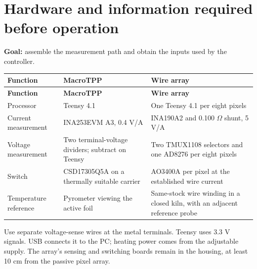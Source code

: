 \documentclass[11pt,letterpaper]{article}
\newlength{\TableWidth}
\begin{document}
\section{Hardware and information required before operation}

\textbf{Goal:} assemble the measurement path and obtain the inputs used by the controller.

\begingroup
\small
\setlength{\tabcolsep}{5pt}
\renewcommand{\arraystretch}{1.14}
\setlength{\TableWidth}{\dimexpr\linewidth-4\tabcolsep\relax}
\begin{longtable}{@{}L{0.220\TableWidth}L{0.400\TableWidth}L{0.380\TableWidth}@{}}
\toprule
\textbf{Function} & \textbf{MacroTPP} & \textbf{Wire array} \\
\midrule
\endfirsthead
\toprule
\textbf{Function} & \textbf{MacroTPP} & \textbf{Wire array} \\
\midrule
\endhead
\midrule
\endfoot
\bottomrule
\endlastfoot
Processor & Teensy 4.1 & One Teensy 4.1 per eight pixels \\
Current measurement & INA253EVM A3, 0.4 V/A & INA190A2 and 0.100 \ensuremath{\Omega} shunt, 5 V/A \\
Voltage measurement & Two terminal-voltage dividers; subtract on Teensy & Two TMUX1108 selectors and one AD8276 per eight pixels \\
Switch & CSD17305Q5A on a thermally suitable carrier & AO3400A per pixel at the established wire current \\
Temperature reference & Pyrometer viewing the active foil & Same-stock wire winding in a closed kiln, with an adjacent reference probe \\
\end{longtable}
\endgroup


Use separate voltage-sense wires at the metal terminals. Teensy uses 3.3 V signals. USB connects it to the PC; heating power comes from the adjustable supply. The array's sensing and switching boards remain in the housing, at least 10 cm from the passive pixel array.
\end{document}
